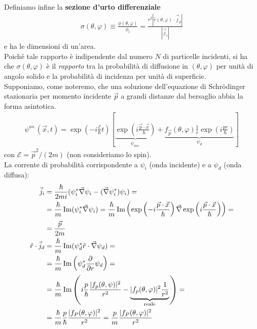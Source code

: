 \documentclass[../../FisicaTeorica.tex]{subfiles}
\begin{document}
Definiamo infine la \textbf{sezione d'urto differenziale} \begin{align*}
\sigma(\theta,\varphi) \equiv \frac{\phi(\theta,\varphi)}{\phi_i} = \frac{r^2 |\hat{r}(\theta,\varphi)\cdot \vec{j}_d|}{|\vec{j}_i|}
\end{align*}
e ha le dimensioni di un'area.\\
Poiché tale rapporto è indipendente dal numero $N$ di particelle incidenti, si ha che $\sigma(\theta,\varphi)$ è il \textit{rapporto} tra la probabilità di diffusione in $(\theta,\varphi)$ per unità di angolo solido e la probabilità di incidenza per unità di superficie.\\

Supponiamo, come noteremo, che una soluzione dell'equazione di Schr\"odinger stazionaria per momento incidente $\vec{p}$ a grandi distanze dal bersaglio abbia la forma asintotica.
\begin{align*}
\psi^{as.}(\vec{x},t) = \exp\left(-i\frac{\mathcal{E}}{\hbar}t \right) \left[ \underbrace{\exp\left(i\frac{\vec{p}\cdot\vec{x}}{\hbar} \right) }_{\psi_{inc.}}+\underbrace{ f_{\vec{p}}(\theta,\varphi)\frac{1}{r}\exp\left(i\frac{pr}{\hbar}\right) }_{\psi_d}\right] 
\end{align*}
con $\mathcal{E} = \vec{p}^2/(2m)$ (non consideriamo lo spin).\\

La corrente di probabilità corrispondente a $\psi_i$ (onda incidente) e a $\psi_d$ (onda diffusa):
\begin{align*}
\vec{j}_i &= \frac{\hbar}{2mi}(\psi_i^* \vec{\nabla}\psi_i - (\vec{\nabla}\psi_i^* ) \psi_i) =\\
&= \frac{\hbar}{m} \operatorname{Im}(\psi_i^* \vec{\nabla}\psi_i) = \frac{\hbar}{m} \operatorname{Im}\left(\exp\left(-i\frac{\vec{p}\cdot \vec{x}}{\hbar}\right) \vec{\nabla}\exp\left(i\frac{\vec{p}\cdot \vec{x}}{\hbar} \right)\right) =\\
&= \frac{\vec{p}}{2m}\\
\hat{r}\cdot \vec{j}_d &= \frac{\hbar}{m} \operatorname{Im}(\psi_d^* \hat{r} \cdot \vec{\nabla}\psi_d) =\\
&= \frac{\hbar}{m} \operatorname{Im} \left(\psi^*_d \frac{\partial}{\partial r}\psi_d\right) = \\
&= \frac{\hbar}{m}\operatorname{Im}\left(i\frac{p}{\hbar}\frac{|f_p(\theta,\psi)|^2}{r^2}-\underbrace{|f_p(\theta,\varphi)|^2 \frac{1}{r^2}}_{\text{reale}}\right) =\\
&= \frac{\hbar}{m}\frac{p}{\hbar} \frac{|f_P(\theta,\varphi)|^2}{r^2} = \frac{p}{m}\frac{|f_P(\theta,\varphi)|^2}{r^2} 
\end{align*}
\end{document}
